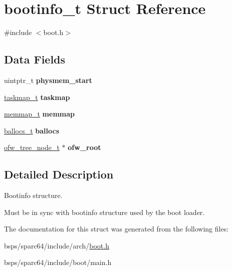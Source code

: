 \hypertarget{structbootinfo__t}{}\section{bootinfo\+\_\+t Struct Reference}
\label{structbootinfo__t}


{\ttfamily \#include $<$boot.\+h$>$}

\subsection*{Data Fields}
\begin{DoxyCompactItemize}
\item 
\mbox{\label{structbootinfo__t_ad07441d8086c4eb64fc74bb8422f58e1}} 
uintptr\+\_\+t {\bfseries physmem\+\_\+start}
\item 
\mbox{\label{structbootinfo__t_a84ddf6dd467d50f372421c2bcb48b266}} 
\mbox{\hyperlink{structtaskmap__t}{taskmap\+\_\+t}} {\bfseries taskmap}
\item 
\mbox{\label{structbootinfo__t_a9f9b178771acc46767138764fc1ced3b}} 
\mbox{\hyperlink{structmemmap__t}{memmap\+\_\+t}} {\bfseries memmap}
\item 
\mbox{\label{structbootinfo__t_ae9ab47777e559ffc18fc7a386f1ec348}} 
\mbox{\hyperlink{structballocs__t}{ballocs\+\_\+t}} {\bfseries ballocs}
\item 
\mbox{\label{structbootinfo__t_ae383f47b570363f85ee2531ea1a1eabe}} 
\mbox{\hyperlink{structofw__tree__node}{ofw\+\_\+tree\+\_\+node\+\_\+t}} $\ast$ {\bfseries ofw\+\_\+root}
\end{DoxyCompactItemize}


\subsection{Detailed Description}
Bootinfo structure.

Must be in sync with bootinfo structure used by the boot loader. 

The documentation for this struct was generated from the following files\+:\begin{DoxyCompactItemize}
\item 
bsps/sparc64/include/arch/\mbox{\hyperlink{sparc64_2include_2arch_2boot_8h}{boot.\+h}}\item 
bsps/sparc64/include/boot/main.\+h\end{DoxyCompactItemize}
